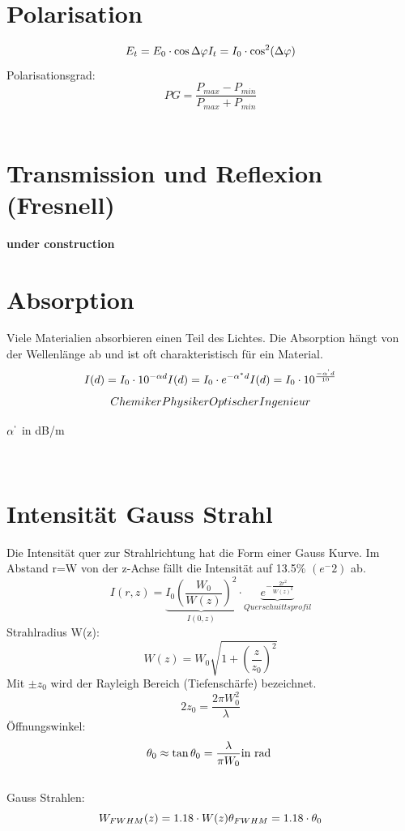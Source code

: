 \section{Polarisation}
\[
	E_t=E_0\cdot \cos\Delta\varphi \\
	I_t= I_0\cdot\cos^2(\Delta\varphi)
\]
Polarisationsgrad:
\[
	PG= \frac{P_{max}-P_{min}}{P_{max}+P_{min}}
\]
\\
\section{Transmission und Reflexion (Fresnell)}
\textbf{under construction}
\\
\section{Absorption}
Viele Materialien absorbieren einen Teil des Lichtes. Die Absorption hängt von der Wellenlänge ab und ist oft charakteristisch für ein Material.
\[
	I(d)=I_0\cdot 10^{-\alpha d} \\
	I(d)=I_0\cdot e^{-\alpha^* d} \\
	I(d)=I_0 \cdot 10^{\frac{-\alpha^` d}{10}}
\]
\[
	Chemiker \\ \\
	Physiker \\ \\ \\
	Optischer Ingenieur
\]
\begin{footnotesize}
	$\alpha^`$	in dB/m \\
\end{footnotesize}
\\
\section{Intensität Gauss Strahl}
Die Intensität quer zur Strahlrichtung hat die Form einer Gauss Kurve. Im Abstand r=W von der z-Achse fällt die Intensität auf 13.5\% $(e^-2)$ ab.
\[
	I(r,z)=\underbrace{I_0 \left(\frac{W_0}{W(z)}\right)^2}_{I(0,z)} 
	\cdot \underbrace{e^{-\frac{2r^2}{W(z)^2}}}_{Querschnittsprofil} 
\]
Strahlradius W(z):
\[
	W(z)=W_0\sqrt{1+\left( \frac{z}{z_0}\right) ^2}
\]
Mit $\pm z_0$ wird der Rayleigh Bereich (Tiefenschärfe) bezeichnet.
\[
	2z_0=\frac{2\pi W_0^2}{\lambda}
\]
Öffnungswinkel:
\[
	\theta_0 \approx \tan \theta_0 = \frac{\lambda}{\pi W_0} \\ \text{in rad } \\ \\
\]
\\
Gauss Strahlen:
\[
	W_{FWHM}(z)=1.18\cdot W(z) \\
	\theta_{FWHM} = 1.18 \cdot\theta_0 \\ \\
\]